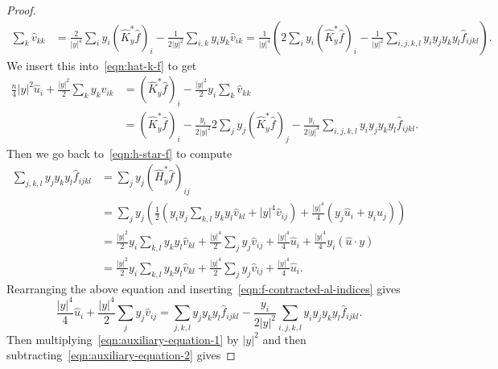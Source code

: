 \documentclass[11pt]{article}
\newcommand{\abs}[1]{\lvert #1 \rvert}
\begin{document}
\begin{proof}
\begin{equation}
\begin{split}
\sum_k
\widehat v_{kk}
&=
\frac{2}{\abs{y}^4}
\sum_i
y_i(\widehat{K}^*_y\widehat f)_i
-
\frac{1}{2\abs{y}^2}
\sum_{i,k}
y_iy_k\widehat v_{ik}
=
\frac{1}{\abs{y}^4}
\left(
2
\sum_i
y_i(\widehat{K}^*_y\widehat f)_i
-
\frac{1}{\abs{y}^2}
\sum_{i,j,k,l}
y_iy_jy_ky_l
\widehat f_{ijkl}
\right).
\end{split}
\end{equation}
We insert this into~\eqref{eqn:hat-k-f} to get
\begin{equation}
\label{eqn:auxiliary-equation-1}
\begin{split}
\frac{n}{4}\abs{y}^2\widehat u_i
+
\frac{\abs{y}^2}{2}
\sum_k y_k\widehat v_{ik}
&=
(\widehat{K}^*_y\widehat f)_i
-
\frac{\abs{y}^2}{2}
y_i
\sum_k \widehat v_{kk}
\\
&=
(\widehat{K}^*_y\widehat f)_i
-
\frac{y_i}{2\abs{y}^2}
2\sum_{j}y_j(\widehat{K}^*_y\widehat f)_j
-
\frac{y_i}{2\abs{y}^4}
\sum_{i,j,k,l}
y_iy_jy_ky_l
\widehat f_{ijkl}
.
\end{split}
\end{equation}
Then we go back to~\eqref{eqn:h-star-f} to compute
\begin{equation}
\begin{split}
\sum_{j,k,l}y_jy_ky_l\widehat f_{ijkl}
&=
\sum_{j}
y_j(\widehat{H}^*_y\widehat f)_{ij}
\\
&=
\sum_jy_j
\left(
\frac12
\left(
y_iy_j
\sum_{k,l}
y_ky_l\widehat v_{kl}
+
\abs{y}^4
\widehat v_{ij}
\right)
+
\frac{\abs{y}^4}{4}
\left(
y_j\widehat u_i
+
y_i\widehat u_j
\right)
\right)
\\
&=
\frac{\abs{y}^2}{2}
y_i
\sum_{k,l}
y_ky_l
\widehat v_{kl}
+
\frac{\abs{y}^4}{2}
\sum_jy_j\widehat v_{ij}
+
\frac{\abs{y}^4}{4}\widehat u_i
+
\frac{\abs{y}^4}{4}y_i(\widehat u \cdot y)
\\
&=
\frac{\abs{y}^2}{2}
y_i
\sum_{k,l}
y_ky_l
\widehat v_{kl}
+
\frac{\abs{y}^4}{2}
\sum_jy_j\widehat v_{ij}
+
\frac{\abs{y}^4}{4}\widehat u_i.
\end{split}
\end{equation}
Rearranging the above equation and inserting~\eqref{eqn:f-contracted-al-indices} gives
\begin{equation}
\label{eqn:auxiliary-equation-2}
\frac{\abs{y}^4}{4}\widehat u_i
+
\frac{\abs{y}^4}{2}
\sum_jy_j\widehat v_{ij}
=
\sum_{j,k,l}
y_jy_ky_l
\widehat f_{ijkl}
-
\frac{y_i}{2\abs{y}^2}
\sum_{i,j,k,l}
y_iy_jy_ky_l
\widehat f_{ijkl}.
\end{equation}
Then multiplying~\eqref{eqn:auxiliary-equation-1} by $\abs{y}^2$ and then subtracting~\eqref{eqn:auxiliary-equation-2} gives

\end{proof}
\end{document}
